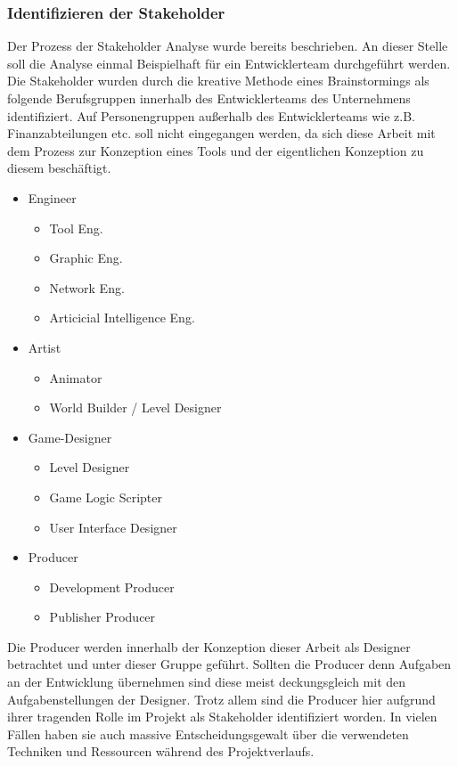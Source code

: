 \documentclass[pagesize, paper=a4, fontsize=12pt, titlepage=true, headings=small, headnosepline, abstractoff, liststotoc, nochapterprefix, plainheadsepline, twoside]{scrreprt}
\begin{document}
\subsubsection{Identifizieren der Stakeholder}
Der Prozess der Stakeholder Analyse wurde bereits beschrieben. An dieser Stelle soll die Analyse einmal Beispielhaft für ein Entwicklerteam durchgeführt werden. Die Stakeholder wurden durch die kreative Methode eines Brainstormings als folgende Berufsgruppen innerhalb des Entwicklerteams des Unternehmens identifiziert. Auf Personengruppen außerhalb des Entwicklerteams wie z.B. Finanzabteilungen etc. soll nicht eingegangen werden, da sich diese Arbeit mit dem Prozess zur Konzeption eines Tools und der eigentlichen Konzeption zu diesem beschäftigt.
\begin{itemize}
\item Engineer
	\begin{itemize}
	\item Tool Eng.
	\item Graphic Eng.
	\item Network Eng.
	\item Articicial Intelligence Eng.
	\end{itemize}
\item Artist
	\begin{itemize}
	\item Animator
	\item World Builder / Level Designer
	\end{itemize}
\item Game-Designer
	\begin{itemize}
	\item Level Designer
	\item Game Logic Scripter
	\item User Interface Designer
	\end{itemize}
\item Producer
	\begin{itemize}
	\item Development Producer
	\item Publisher Producer
	\end{itemize}
\end{itemize}
Die Producer werden innerhalb der Konzeption dieser Arbeit als Designer betrachtet und unter dieser Gruppe geführt. Sollten die Producer denn Aufgaben an der Entwicklung übernehmen sind diese meist deckungsgleich mit den Aufgabenstellungen der Designer. Trotz allem sind die Producer hier aufgrund ihrer tragenden Rolle im Projekt als Stakeholder identifiziert worden. In vielen Fällen haben sie auch massive Entscheidungsgewalt über die verwendeten Techniken und Ressourcen während des Projektverlaufs.
\end{document}
